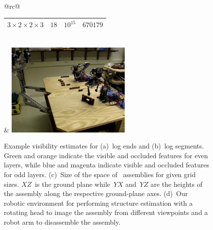 \begin{figure}
\begin{tabular}{@{}rc@{}}
\begin{tabular}[b]{@{}c@{\hspace{10pt}}r@{\hspace{10pt}}r@{\hspace{10pt}}r@{}}
      $3 \times 2 \times 2 \times 3$ &          $18$ &         $10^{15}$ & $670179$\\
      \bottomrule
    \end{tabular}\\
     & \includegraphics[width=0.55\textwidth]{images/robots}
  \end{tabular}
  \par\vspace*{-2ex}
  \caption{Example visibility estimates for (a)~log ends and (b)~log segments.
    Green and orange indicate the visible and occluded features for
    even layers, while blue and magenta indicate visible and occluded features
    for odd layers.
    (c)~Size of the space of \LincolnLog\ assemblies for given grid
    sizes.
    $XZ$~is the ground plane while~$YX$ and~$YZ$ are the heights of the
    assembly along the respective ground-plane axes.
    (d)~Our robotic environment for performing structure estimation
    with a rotating head to image the assembly from different viewpoints and a
    robot arm to disassemble the assembly.}
  \label{fig-ll2:complexity}
  \par\vspace*{-5ex}
\end{figure}

